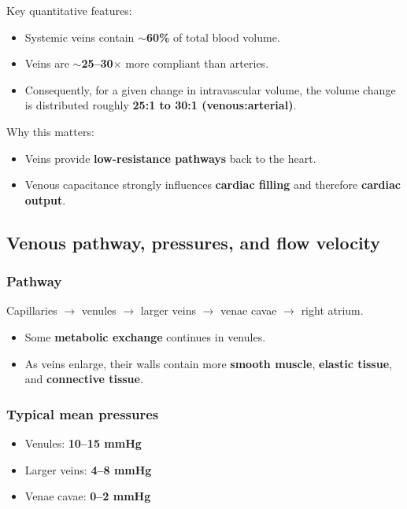 \documentclass[11pt,a4paper]{article}
\begin{document}
Key quantitative features:
\begin{itemize}
\item Systemic veins contain \textbf{$\sim$60\%} of total blood volume.
\item Veins are \textbf{$\sim$25--30$\times$} more compliant than arteries.
\item Consequently, for a given change in intravascular volume, the volume change is distributed roughly \textbf{25:1 to 30:1 (venous:arterial)}.
\end{itemize}

Why this matters:
\begin{itemize}
\item Veins provide \textbf{low-resistance pathways} back to the heart.
\item Venous capacitance strongly influences \textbf{cardiac filling} and therefore \textbf{cardiac output}.
\end{itemize}

\subsection{Venous pathway, pressures, and flow velocity}

\subsubsection{Pathway}
Capillaries $\rightarrow$ venules $\rightarrow$ larger veins $\rightarrow$ venae cavae $\rightarrow$ right atrium.
\begin{itemize}
\item Some \textbf{metabolic exchange} continues in venules.
\item As veins enlarge, their walls contain more \textbf{smooth muscle}, \textbf{elastic tissue}, and \textbf{connective tissue}.
\end{itemize}

\subsubsection{Typical mean pressures}
\begin{itemize}
\item Venules: \textbf{10--15 mmHg}
\item Larger veins: \textbf{4--8 mmHg}
\item Venae cavae: \textbf{0--2 mmHg}
\end{itemize}
\end{document}
